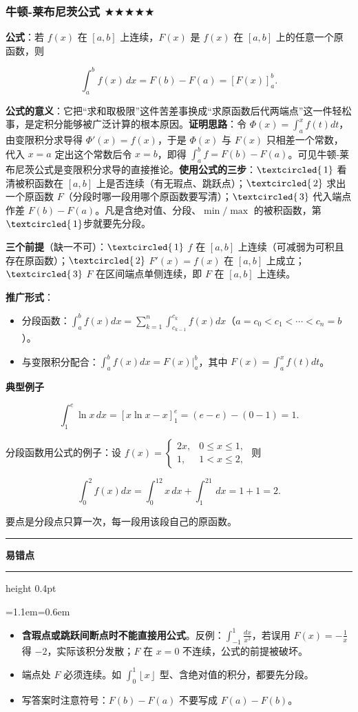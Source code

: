 \documentclass[11pt,openany,UTF8]{ctexbook}
\newcommand{\circled}[1]{\textcircled{\scriptsize\,#1}}
\newcommand{\callouthead}[2]{%
  \par\addvspace{7pt}\noindent
  {\color{#1}\rule[-0.15em]{3pt}{1.05em}}\hspace{0.5em}%
  {\bfseries\color{#1}#2}\par\nobreak\vspace{-0.35em}%
  {\color{rulesep}\hrule height 0.4pt}\nobreak\vspace{0.45em}%
  \begingroup\small\setlength{\parindent}{0pt}%
  \leftskip=1.1em\rightskip=0.6em\noindent\ignorespaces}
\newcommand{\calloutend}{\par\endgroup\addvspace{7pt}}
\newenvironment{callwarn}[1]{\callouthead{warnbar}{#1}}{\calloutend}
\begin{document}
\subsubsection{牛顿-莱布尼茨公式 $\bigstar$$\bigstar$$\bigstar$$\bigstar$$\bigstar$}

\textbf{公式}：若 $f(x)$ 在 $[a,b]$ 上连续，$F(x)$ 是 $f(x)$ 在 $[a,b]$ 上的任意一个原函数，则

\[\int_a^bf(x)\,dx=F(b)-F(a)=\left[F(x)\right]_a^b.\]

\textbf{公式的意义}：它把“求和取极限”这件苦差事换成“求原函数后代两端点”这一件轻松事，是定积分能够被广泛计算的根本原因。\textbf{证明思路}：令 $\Phi(x)=\int_a^xf(t)dt$，由变限积分求导得 $\Phi'(x)=f(x)$，于是 $\Phi(x)$ 与 $F(x)$ 只相差一个常数，代入 $x=a$ 定出这个常数后令 $x=b$，即得 $\int_a^bf=F(b)-F(a)$。可见牛顿-莱布尼茨公式是变限积分求导的直接推论。\textbf{使用公式的三步}：$\circled{1}$ 看清被积函数在 $[a,b]$ 上是否连续（有无瑕点、跳跃点）；$\circled{2}$ 求出一个原函数 $F$（分段时哪一段用哪个原函数要写清）；$\circled{3}$ 代入端点作差 $F(b)-F(a)$。凡是含绝对值、分段、$\min/\max$ 的被积函数，第$\circled{1}$步就要先分段。

\textbf{三个前提}（缺一不可）：$\circled{1}$ $f$ 在 $[a,b]$ 上连续（可减弱为可积且存在原函数）；$\circled{2}$ $F'(x)=f(x)$ 在 $[a,b]$ 上成立；$\circled{3}$ $F$ 在区间端点单侧连续，即 $F$ 在 $[a,b]$ 上连续。

\textbf{推广形式}：

\begin{itemize}
\item 分段函数：$\int_a^bf(x)dx=\sum\limits_{k=1}^n\int_{c_{k-1}}^{c_k}f(x)dx$（$a=c_0<c_1<\cdots<c_n=b$）。
\item 与变限积分配合：$\int_a^bf(x)dx=F(x)\big\vert_a^b$，其中 $F(x)=\int_a^xf(t)dt$。
\end{itemize}
\textbf{典型例子}

\[\int_1^e\ln x\,dx=\left[x\ln x-x\right]_1^e=(e-e)-(0-1)=1.\]

分段函数用公式的例子：设 $f(x)=\begin{cases}2x, & 0\leq x\leq1,\\ 1, & 1<x\leq2,\end{cases}$ 则

\[\int_0^2f(x)dx=\int_0^12x\,dx+\int_1^21\,dx=1+1=2.\]

要点是分段点只算一次，每一段用该段自己的原函数。

\begin{callwarn}{易错点}
\begin{itemize}
\item \textbf{含瑕点或跳跃间断点时不能直接用公式}。反例：$\int_{-1}^{1}\frac{dx}{x^2}$，若误用 $F(x)=-\frac{1}{x}$ 得 $-2$，实际该积分发散；$F$ 在 $x=0$ 不连续，公式的前提被破坏。
\item 端点处 $F$ 必须连续。如 $\int_0^1\left\lfloor x\right\rfloor$ 型、含绝对值的积分，都要先分段。
\item 写答案时注意符号：$F(b)-F(a)$ 不要写成 $F(a)-F(b)$。
\end{itemize}
\end{callwarn}
\end{document}
